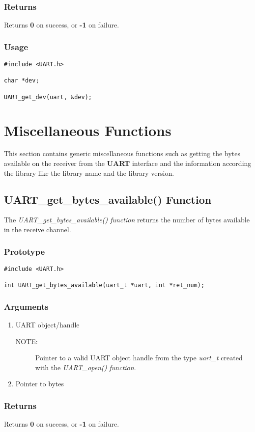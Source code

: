 \documentclass{report}
\begin{document}
\subsubsection*{Returns}
Returns \textbf{0} on success, or \textbf{-1} on failure.
\subsubsection*{Usage}
\begin{lstlisting}
#include <UART.h>

char *dev;

UART_get_dev(uart, &dev);
\end{lstlisting}
\section{Miscellaneous Functions}
This section contains generic miscellaneous functions such as
getting the bytes available on the receiver from the \textbf{UART}
interface and the information according the library like the
library name and the library version.
\subsection{UART\_get\_bytes\_available() Function}
The \textit{UART\_get\_bytes\_available() function} returns the number of
bytes available in the receive channel.
\subsubsection*{Prototype}
\begin{lstlisting}
#include <UART.h>

int UART_get_bytes_available(uart_t *uart, int *ret_num);
\end{lstlisting}
\subsubsection*{Arguments}
\begin{enumerate}
\item UART object/handle
\begin{description}
\item[NOTE:] Pointer to a valid UART object handle from the type \textit{uart\_t}
created with the \textit{UART\_open() function}.
\end{description}
\item Pointer to bytes
\end{enumerate}
\subsubsection*{Returns}
Returns \textbf{0} on success, or \textbf{-1} on failure.
\end{document}
